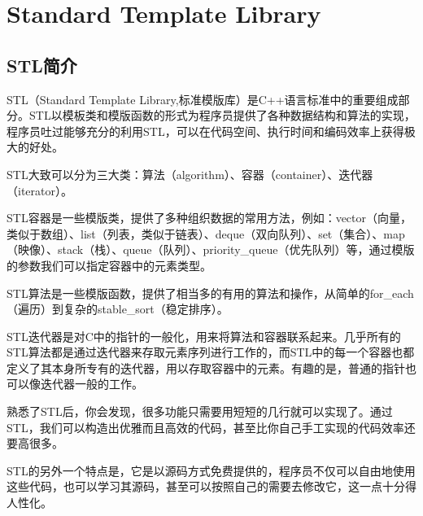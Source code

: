 
\chapter{Standard Template Library}
\label{STL}



\section{STL简介}

STL（Standard Template Library,标准模版库）是C++语言标准中的重要组成部分。STL以模板类和模版函数的形式为程序员提供了各种数据结构和算法的实现，程序员吐过能够充分的利用STL，可以在代码空间、执行时间和编码效率上获得极大的好处。

STL大致可以分为三大类：算法（algorithm）、容器（container）、迭代器（iterator）。

STL容器是一些模版类，提供了多种组织数据的常用方法，例如：vector（向量，类似于数组）、list（列表，类似于链表）、deque（双向队列）、set（集合）、map（映像）、stack（栈）、queue（队列）、priority\_queue（优先队列）等，通过模版的参数我们可以指定容器中的元素类型。
 
STL算法是一些模版函数，提供了相当多的有用的算法和操作，从简单的for\_each（遍历）到复杂的stable\_sort（稳定排序）。 

STL迭代器是对C中的指针的一般化，用来将算法和容器联系起来。几乎所有的STL算法都是通过迭代器来存取元素序列进行工作的，而STL中的每一个容器也都定义了其本身所专有的迭代器，用以存取容器中的元素。有趣的是，普通的指针也可以像迭代器一般的工作。

熟悉了STL后，你会发现，很多功能只需要用短短的几行就可以实现了。通过STL，我们可以构造出优雅而且高效的代码，甚至比你自己手工实现的代码效率还要高很多。 

STL的另外一个特点是，它是以源码方式免费提供的，程序员不仅可以自由地使用这些代码，也可以学习其源码，甚至可以按照自己的需要去修改它，这一点十分得人性化。


